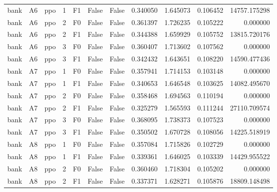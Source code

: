 \begin{tabular}{lllrlllrrrr}
      bank &      A6 &       ppo &     1 &  F1 &           False &            False &  0.340050 &  1.645073 & 0.106452 &     14757.175298 \\
      bank &      A6 &       ppo &     2 &  F0 &           False &            False &  0.361397 &  1.726235 & 0.105222 &         0.000000 \\
      bank &      A6 &       ppo &     2 &  F1 &           False &            False &  0.344388 &  1.659929 & 0.105752 &     13815.720176 \\
      bank &      A6 &       ppo &     3 &  F0 &           False &            False &  0.360407 &  1.713602 & 0.107562 &         0.000000 \\
      bank &      A6 &       ppo &     3 &  F1 &           False &            False &  0.342432 &  1.643651 & 0.108220 &     14590.477436 \\
      bank &      A7 &       ppo &     1 &  F0 &           False &            False &  0.357941 &  1.714153 & 0.103148 &         0.000000 \\
      bank &      A7 &       ppo &     1 &  F1 &           False &            False &  0.340653 &  1.646548 & 0.103625 &     14082.495670 \\
      bank &      A7 &       ppo &     2 &  F0 &           False &            False &  0.358468 &  1.694563 & 0.110194 &         0.000000 \\
      bank &      A7 &       ppo &     2 &  F1 &           False &            False &  0.325279 &  1.565593 & 0.111244 &     27110.709574 \\
      bank &      A7 &       ppo &     3 &  F0 &           False &            False &  0.368095 &  1.738373 & 0.107523 &         0.000000 \\
      bank &      A7 &       ppo &     3 &  F1 &           False &            False &  0.350502 &  1.670728 & 0.108056 &     14225.518919 \\
      bank &      A8 &       ppo &     1 &  F0 &           False &            False &  0.357084 &  1.715826 & 0.102729 &         0.000000 \\
      bank &      A8 &       ppo &     1 &  F1 &           False &            False &  0.339361 &  1.646025 & 0.103339 &     14429.955522 \\
      bank &      A8 &       ppo &     2 &  F0 &           False &            False &  0.360460 &  1.718304 & 0.105202 &         0.000000 \\
      bank &      A8 &       ppo &     2 &  F1 &           False &            False &  0.337371 &  1.628271 & 0.105876 &     18809.148498 \\

\end{tabular}
